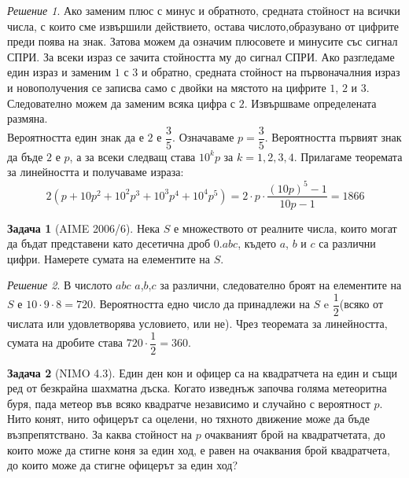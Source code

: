 \documentclass[11 pt, a4paper]{article}
\theoremstyle{definition}
\newtheorem{p}{Задача}
\theoremstyle{remark}
\newtheorem*{s}{Решение}
\begin{document}
\begin{s}
Ако заменим плюс с минус и обратното, средната стойност на всички числа, с които сме извършили действието, остава числото,образувано от цифрите преди поява на знак. Затова можем да означим плюсовете и минусите със сигнал СПРИ. За всеки израз се зачита стойността му до сигнал СПРИ. Ако разгледаме един израз и заменим $1$ с $3$ и обратно, средната стойност на първоначалния израз и новополучения се записва само с двойки на мястото на цифрите $1$, $2$ и $3$. Следователно можем да заменим всяка цифра с $2$. Извършваме определената размяна.\\
Вероятността един знак да е $2$ е $\dfrac{3}{5}$. Означаваме $p=\dfrac{3}{5}$. Вероятността първият знак да бъде $2$ е $p$, а за всеки следващ става $10^k p$ за $k=1,2,3,4$. Прилагаме теоремата за линейността и получаваме израза:
\begin{equation*}
2(p+10p^2+10^2 p^3+10^3 p^4+10^4 p^5)=2\cdot p\cdot\dfrac{(10p)^5-1}{10p-1}=1866
\end{equation*}

\end{s}
\begin{p}[AIME 2006/6]

Нека $S$ е множеството от реалните числа, които могат да бъдат представени като десетична дроб $0.a b c$, където $a$, $b$ и $c$ са различни цифри. Намерете сумата на елементите на $S$.\par
\end{p}
\begin{s}
В числото $abc$ $a$,$b$,$c$ за различни, следователно броят на елементите на $S$ е $10\cdot9\cdot8=720$. Вероятността едно число да принадлежи на $S$ e $\dfrac{1}{2}$(всяко от числата или удовлетворява условието, или не). Чрез теоремата за линейността, сумата на дробите става $720\cdot\dfrac{1}{2}=360$.\\
\end{s}
\begin{p}[NIMO 4.3]

Един ден кон и офицер са на квадратчета на един и същи ред от безкрайна шахматна дъска. Когато изведнъж започва голяма метеоритна буря, пада метеор във всяко квадратче независимо и случайно с вероятност $p$. Нито конят, нито офицерът са оцелени, но тяхното движение може да бъде възпрепятствано. За каква стойност на $p$ очакваният брой на квадратчетата, до които може да стигне коня за един ход, е равен на очаквания брой квадратчета, до които може да стигне офицерът за един ход?\par
\end{p}
\end{document}
